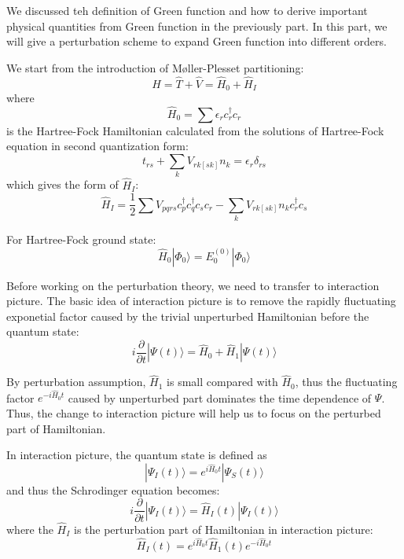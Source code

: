 We discussed teh definition of Green function and how to derive important physical quantities from Green function in the previously part.
In this part, we will give a perturbation scheme to expand Green function into different orders.

We start from the introduction of M{\o}ller-Plesset partitioning:
\begin{equation}
\hat{H}=\hat{T}+\hat{V}=\hat{H}_{0}+\hat{H}_{I}
\end{equation}
where
\begin{equation}
\hat{H}_{0}=\sum \epsilon_{r} c_{r}^{\dagger} c_{r}
\end{equation}
is the Hartree-Fock Hamiltonian calculated from the solutions of Hartree-Fock equation in second quantization form:
\begin{equation}
t_{r s}+\sum_{k} V_{r k[s k]} n_{k}=\epsilon_{r} \delta_{r s}
\end{equation}
which gives the form of $\hat{H}_I$:
\begin{equation}
\hat{H}_I=\frac{1}{2} \sum V_{p q r s} c_{p}^{\dagger} c_{q}^{\dagger} c_{s} c_{r}-\sum_{k} V_{r k[s k]} n_{k} c_{r}^{\dagger} c_{s}
\end{equation}

For Hartree-Fock ground state:
\begin{equation}
\hat{H}_{0} | \Phi_{0} \rangle=E_{0}^{(0)} | \Phi_{0} \rangle
\end{equation}

Before working on the perturbation theory, we need to transfer to interaction picture.
The basic idea of interaction picture is to remove the rapidly fluctuating exponetial factor caused by the trivial unperturbed Hamiltonian before the quantum state:
\begin{equation}
i \frac{\partial}{\partial t} | \Psi(t) \rangle=\hat{H}_{0}+\hat{H}_{1} | \Psi(t) \rangle
\end{equation}

By perturbation assumption, $\hat{H}_1$ is small compared with $\hat{H}_0$, thus the fluctuating factor $e^{-i \hat{H}_0 t}$ caused by unperturbed part dominates the time dependence of $\Psi$.
Thus, the change to interaction picture will help us to focus on the perturbed part of Hamiltonian.

In interaction picture, the quantum state is defined as
\begin{equation}
| \Psi_{I}(t) \rangle=e^{i \hat{H}_{0} t} | \Psi_{S}(t) \rangle
\end{equation}
and thus the Schrodinger equation becomes:
\begin{equation}
i \frac{\partial}{\partial t} | \Psi_{I}(t) \rangle=\hat{H}_{I}(t) | \Psi_{I}(t) \rangle
\end{equation}
where the $\hat{H}_I$ is the perturbation part of Hamiltonian in interaction picture:
\begin{equation}
\hat{H}_{I}(t)=e^{i \hat{H}_{0} t} \hat{H}_{1}(t) e^{-i \hat{H}_{0} t}
\end{equation}

